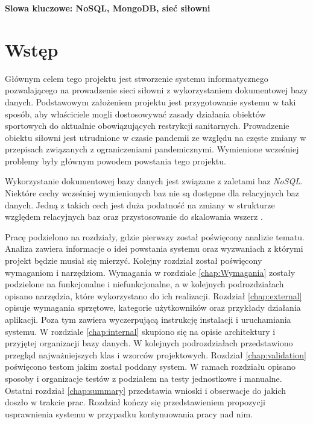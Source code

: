 \documentclass[a4paper,twoside,12pt]{book}
\begin{document}
{\bf Slowa kluczowe: NoSQL, MongoDB, sieć siłowni


\cleardoublepage

\pagestyle{NumeryStronNazwyRozdzialow}


\chapter{Wstęp}

Głównym celem tego projektu jest stworzenie systemu informatycznego pozwalającego na prowadzenie sieci siłowni z wykorzystaniem dokumentowej bazy danych. Podstawowym założeniem projektu jest przygotowanie systemu w taki sposób, aby właściciele mogli dostosowywać zasady działania obiektów sportowych do aktualnie obowiązujących restrykcji sanitarnych. Prowadzenie obiektu siłowni jest utrudnione w czasie pandemii ze względu na częste zmiany w przepisach związanych z ograniczeniami pandemicznymi. Wymienione wcześniej problemy były głównym powodem powstania tego projektu.

Wykorzystanie dokumentowej bazy danych jest związane z zaletami baz \textit{NoSQL}. Niektóre cechy wcześniej wymienionych baz nie są dostępne dla relacyjnych baz danych. Jedną z takich cech jest duża podatność na zmiany w strukturze względem relacyjnych baz oraz przystosowanie do skalowania wszerz \cite{bib:noSqlVsSql}.

Pracę podzielono na rozdziały, gdzie pierwszy został poświęcony analizie tematu. Analiza zawiera informacje o idei powstania systemu oraz wyzwaniach z którymi projekt będzie musiał się mierzyć. Kolejny rozdział został poświęcony wymaganiom i narzędziom. Wymagania w rozdziale \ref{chap:Wymagania} zostały podzielone na funkcjonalne i niefunkcjonalne, a w kolejnych podrozdziałach opisano narzędzia, które wykorzystano do ich realizacji. Rozdział \ref{chap:external} opisuje wymagania sprzętowe, kategorie użytkowników oraz przykłady działania aplikacji. Poza tym zawiera wyczerpującą instrukcję instalacji i uruchamiania systemu. W rozdziale \ref{chap:internal} skupiono się na opisie architektury i przyjętej organizacji bazy danych. W kolejnych podrozdziałach przedstawiono przegląd najważniejszych klas i wzorców projektowych. Rozdział \ref{chap:validation} poświęcono testom jakim został poddany system. W ramach rozdziału opisano sposoby i organizacje testów z podziałem na testy jednostkowe i manualne. Ostatni rozdział \ref{chap:summary} przedstawia wnioski i obserwacje do jakich doszło w trakcie prac. Rozdział kończy się przedstawieniem propozycji usprawnienia systemu w przypadku kontynuowania pracy nad nim.

}
\end{document}
